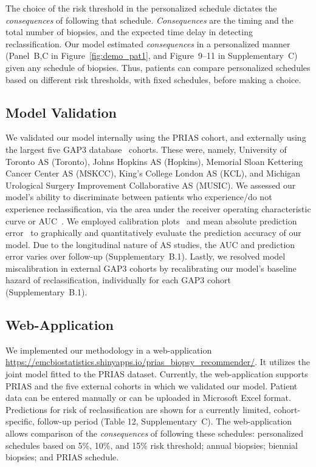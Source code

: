 The choice of the risk threshold in the personalized schedule dictates the \textit{consequences} of following that schedule. \textit{Consequences} are the timing and the total number of biopsies, and the expected time delay in detecting reclassification. Our model estimated \textit{consequences} in a personalized manner (Panel~B,C in Figure~\ref{fig:demo_pat1}, and Figure~9--11 in Supplementary~C) given any schedule of biopsies. Thus, patients can compare personalized schedules based on different risk thresholds, with fixed schedules, before making a choice.

\subsection{Model Validation}
We validated our model internally using the PRIAS cohort, and externally using the largest five GAP3 database~\citep{gap3_2018} cohorts. These were, namely, University of Toronto AS (Toronto), Johns Hopkins AS (Hopkins), Memorial Sloan Kettering Cancer Center AS (MSKCC), King's College London AS (KCL), and Michigan Urological Surgery Improvement Collaborative AS (MUSIC). We assessed our model's ability to discriminate between patients who experience/do not experience reclassification, via the area under the receiver operating characteristic curve or AUC~\citep{rizopoulos2017dynamic}. We employed calibration plots~\citep{royston2013external,steyerberg2010assessing} and mean absolute prediction error~\citep{rizopoulos2017dynamic} to graphically and quantitatively evaluate the prediction accuracy of our model. Due to the longitudinal nature of AS studies, the AUC and prediction error varies over follow-up (Supplementary~B.1). Lastly, we resolved model miscalibration in external GAP3 cohorts by recalibrating our model's baseline hazard of reclassification, individually for each GAP3 cohort (Supplementary~B.1).

\subsection{Web-Application}
We implemented our methodology in a web-application \url{https://emcbiostatistics.shinyapps.io/prias_biopsy_recommender/}. It utilizes the joint model fitted to the PRIAS dataset. Currently, the web-application supports PRIAS and the five external cohorts in which we validated our model. Patient data can be entered manually or can be uploaded in Microsoft Excel format. Predictions for risk of reclassification are shown for a currently limited, cohort-specific, follow-up period (Table 12, Supplementary~C). The web-application allows comparison of the \textit{consequences} of following these schedules: personalized schedules based on 5\%, 10\%, and 15\% risk threshold; annual biopsies; biennial biopsies; and PRIAS schedule.
